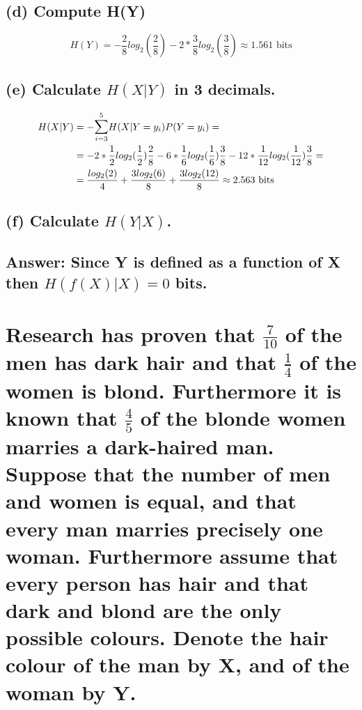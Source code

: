 \documentclass[11px]{article}
\begin{document}
\subsection*{\normalfont (d) Compute H(Y)}

\begin{equation}
H(Y) = -\frac{2}{8}log_2(\frac{2}{8}) - 2*\frac{3}{8}log_2(\frac{3}{8}) \approx 1.561 \text{ bits}     
\end{equation}
\subsection*{\normalfont (e) Calculate \(H(X|Y)\) in 3 decimals.}

\begin{equation}
\begin{split}
H(X|Y) & = -\mathlarger{\sum}_{i=3}^{5} H(X|Y = y_i)P(Y = y_i) = \\
& = -2*\frac{1}{2}log_2(\frac{1}{2})\frac{2}{8} - 6*\frac{1}{6}log_2(\frac{1}{6})\frac{3}{8} - 12*\frac{1}{12}log_2(\frac{1}{12})\frac{3}{8} = \\
& = \frac{log_2(2)}{4} + \frac{3log_2(6)}{8} + \frac{3log_2(12)}{8} \approx 2.563 \text{ bits}
\end{split}
\end{equation}

\subsection*{\normalfont (f) Calculate \(H(Y|X)\).}
\subsection*{Answer: Since Y is defined as a function of X then \(H(f(X)|X) = 0\) bits.}




\section{\normalfont Research has proven that \(\frac{7}{10}\) of the men has dark hair and that \(\frac{1}{4}\) of the women is blond. Furthermore it is known that \(\frac{4}{5}\) of the blonde women marries a dark-haired man. Suppose that the number of men and women is equal, and that every man marries precisely one woman. Furthermore assume that every person has hair and that dark and blond are the only possible colours. Denote the hair colour of the man by X, and of the woman by Y.}
\end{document}
